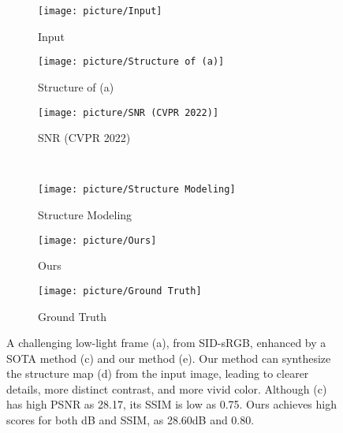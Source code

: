 \documentclass[letterpaper,10pt]{article}
\begin{document}
			\begin{figure}[htbp] 
				\centering 
				
				\begin{subfigure}{0.25\textwidth}
					\texttt{[image: picture/Input]}
					\captionsetup{font=scriptsize}
					\caption{Input}
					\label{fig: Input}
				\end{subfigure}
				\begin{subfigure}{0.25\textwidth}
					\texttt{[image: picture/Structure of (a)]}
					\captionsetup{font=scriptsize}
					\caption{Structure of (a)}
					\label{fig: Structure of (a)}
				\end{subfigure}
				\begin{subfigure}{0.25\textwidth}
					\texttt{[image: picture/SNR (CVPR 2022)]}
					\captionsetup{font=scriptsize}
					\caption{SNR (CVPR 2022)}
					\label{fig: SNR (CVPR 2022)}	
				\end{subfigure} \\
				\begin{subfigure}{0.25\textwidth}
					\texttt{[image: picture/Structure Modeling]}
					\captionsetup{font=scriptsize}
					\caption{Structure Modeling}
					\label{fig: Structure Modeling}
				\end{subfigure}
				\begin{subfigure}{0.25\textwidth}
					\texttt{[image: picture/Ours]}
					\captionsetup{font=scriptsize}
					\caption{Ours}
					\label{fig: Ours}
				\end{subfigure}
				\begin{subfigure}{0.25\textwidth}
					\texttt{[image: picture/Ground Truth]}
					\captionsetup{font=scriptsize}
					\caption{Ground Truth}
					\label{fig: Ground Truth}
				\end{subfigure}
				
				\captionsetup{font=scriptsize}
				\caption{
					\label{fig: Structural Information}
					A challenging low-light frame (a), from SID-sRGB\cite{chen2018learning},
					enhanced by a SOTA method (c) and our method (e). Our method
					can synthesize the structure map (d) from the input image, leading
					to clearer details, more distinct contrast, and more vivid color. Although
					(c) has high PSNR as 28.17, its SSIM is low as 0.75. Ours
					achieves high scores for both dB and SSIM, as 28.60dB and 0.80.
				}
			\end{figure}
			
\end{document}
